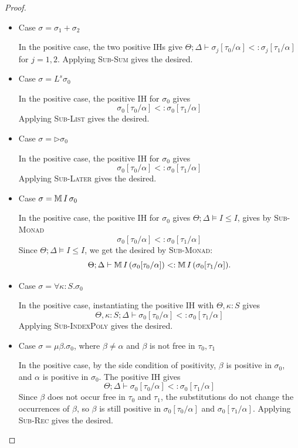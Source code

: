 \begin{proof}
\begin{itemize}
In the positive case, the two positive IHs give
$\Theta;\Delta\vdash\sigma_j[\tau_0/\alpha]<:\sigma_j[\tau_1/\alpha]$
for $j=1,2$. Applying \textsc{Sub-Product} gives the desired.

\item Case $\sigma=\sigma_1+\sigma_2$

In the positive case, the two positive IHs give
$\Theta;\Delta\vdash\sigma_j[\tau_0/\alpha]<:\sigma_j[\tau_1/\alpha]$
for $j=1,2$. Applying \textsc{Sub-Sum} gives the desired.

\item Case $\sigma=L^s\sigma_0$

In the positive case, the positive IH for $\sigma_0$ gives
\[ \sigma_0[\tau_0/\alpha] <: \sigma_0[\tau_1/\alpha]\]
Applying \textsc{Sub-List} gives the desired.

\item Case $\sigma=\triangleright\sigma_0$

In the positive case, the positive IH for $\sigma_0$ gives
\[\sigma_0[\tau_0/\alpha] <: \sigma_0[\tau_1/\alpha] \]
Applying \textsc{Sub-Later} gives the desired.

\item Case $\sigma=\mathbb{M}\,{I}\, \sigma_0$

In the positive case, the positive IH for $\sigma_0$ gives
$\Theta;\Delta\models I\leq I$, gives by \textsc{Sub-Monad}
\[\sigma_0[\tau_0/\alpha] <: \sigma_0[\tau_1/\alpha]\]
Since $\Theta;\Delta\models I\leq I$, we get the desired by \textsc{Sub-Monad}:
\[
  \Theta;\Delta\vdash\mathbb{M}\,{I}\, (\sigma_0[\tau_0/\alpha])
    <: \mathbb{M}\,{I}\, (\sigma_0[\tau_1/\alpha]).
\]

\item Case $\sigma=\forall\kappa:S.\sigma_0$

In the positive case, instantiating the positive IH with $\Theta,\kappa:S$ gives
\[\Theta,\kappa:S;\Delta\vdash\sigma_0[\tau_0/\alpha]<:\sigma_0[\tau_1/\alpha]\]
Applying \textsc{Sub-IndexPoly} gives the desired.

\item Case $\sigma=\mu\beta.\sigma_0$, where $\beta\neq\alpha$ and $\beta$ is not free in $\tau_0, \tau_1$

In the positive case, by the side condition of positivity, $\beta$ is positive in $\sigma_0$, and $\alpha$ is positive in $\sigma_0$.
The positive IH gives
\[\Theta;\Delta\vdash\sigma_0[\tau_0/\alpha]<:\sigma_0[\tau_1/\alpha]\]
Since $\beta$ does not occur free in $\tau_0$ and $\tau_1$, the substitutions do not change the occurrences of $\beta$, 
so $\beta$ is still positive in $\sigma_0[\tau_0/\alpha]$ and $\sigma_0[\tau_1/\alpha]$.
Applying \textsc{Sub-Rec} gives the desired.
\qedhere
\end{itemize}
\end{proof}

